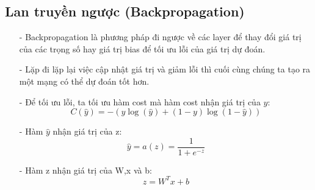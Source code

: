 \documentclass{report}
\begin{document}
        \subsection{Lan truyền ngược (Backpropagation)}
            \fontsize{13}{10}\begin{enumerate}
                \item [- ] Backpropagation là phương pháp đi ngược về các layer để thay đổi giá trị của các trọng số hay giá trị bias để tối ưu lỗi của giá trị dự đoán. 
                \item [- ] Lặp đi lặp lại việc cập nhật giá trị và giảm lỗi thì cuối cùng chúng ta tạo ra một mạng có thể dự đoán tốt hơn.
                \item [- ] Để tối ưu lỗi, ta tối ưu hàm cost mà hàm cost nhận giá trị của $\hat{y}$: 
                                            $$C(\hat{y}) = -(y\log(\hat{y}) + (1 - y)\log(1 - \hat{y}))$$
                \item [- ] Hàm $\hat{y}$ nhận giá trị của z:
                                            $$\hat{y} = a(z) = \frac{1}{1+e^{-z}}$$
                \item [- ] Hàm z nhận giá trị của W,x và b:
                                            $$z = W^T x + b$$
                                            

\end{enumerate}
\end{document}
